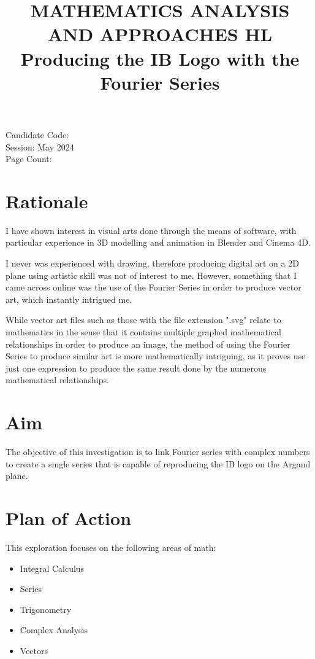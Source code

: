 \documentclass[letterpaper, 12pt]{article}
\title{MATHEMATICS ANALYSIS AND APPROACHES HL
\\
Producing the IB Logo with the Fourier Series}
\author{}
\date{}
\begin{document}
\nocite{*}

\maketitle
\begin{center}
    Candidate Code:
    \\
    Session: May 2024
    \\
    Page Count:
\end{center}
\newpage

\tableofcontents
\newpage

\section{Rationale}

I have shown interest in visual arts done through the means of software,
with particular experience in 3D modelling and animation in Blender
and Cinema 4D.

I never was experienced with drawing, therefore producing digital art
on a 2D plane using artistic skill was not of interest to me. However,
something that I came across online was the use of the Fourier Series
in order to produce vector art, which instantly intrigued me.

While vector art files such as those with the file extension ".svg" relate
to mathematics in the sense that it contains multiple graphed mathematical
relationships in order to produce an image, the method of using the Fourier
Series to produce similar art is more mathematically intriguing, as it
proves use just one expression to produce the same result done by the numerous mathematical
relationships.


\section{Aim}

The objective of this investigation is to link Fourier series with
complex numbers to create a single series that is capable
of reproducing the IB logo on the Argand plane.

\section{Plan of Action}

This exploration focuses on the following areas of math:
\begin{itemize}
    \item Integral Calculus
    \item Series
    \item Trigonometry
    \item Complex Analysis
    \item Vectors
\end{itemize}
\end{document}
